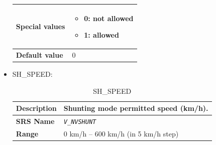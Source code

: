 \documentclass{template/openetcs}
\begin{document}
\begin{itemize}
\begin{longtable}{|l|l|}
				\hline
														
					\begin{minipage}[t]{0.22\linewidth} \textbf{Special values}	\end{minipage} 
				&	\begin{minipage}[t]{0.78\linewidth} \begin{itemize} \item 0: not allowed \item 1: allowed \end{itemize} \end{minipage} \\
				
				\hline
										
					\begin{minipage}[t]{0.22\linewidth} \textbf{Default value}	\end{minipage} 
				&	\begin{minipage}[t]{0.78\linewidth} 0 \end{minipage} \\
				
				\hline
				
			\end{longtable}
			
			
		\item SH\_SPEED:
			\begin{longtable}{|l|l|}
				\caption{SH\_SPEED}\\ 				
				\hline
				
					\begin{minipage}[t]{0.22\linewidth} \textbf{Description}	\end{minipage} 
				&	\begin{minipage}[t]{0.78\linewidth} Shunting mode permitted speed (km/h). \end{minipage} \\
				
				\hline
				
					\begin{minipage}[t]{0.22\linewidth} \textbf{SRS Name}	\end{minipage} 
				&	\begin{minipage}[t]{0.78\linewidth} \emph{\texttt{V\_NVSHUNT}} \end{minipage} \\
				
				\hline
														
					\begin{minipage}[t]{0.22\linewidth} \textbf{Range}	\end{minipage} 
				&	\begin{minipage}[t]{0.78\linewidth} 0 km/h – 600 km/h (in 5 km/h step) \end{minipage} \\
				

\end{longtable}
\end{itemize}
\end{document}
